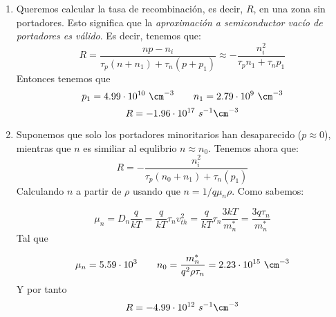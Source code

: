 	\begin{enumerate}[label=\alph*)]
		\item Queremos calcular la tasa de recombinación, es decir, $R$, en una zona sin portadores. Esto significa que la \textit{aproximación a  semiconductor vacío de portadores es válido}. Es decir, tenemos que:
		\begin{equation}
			R = \frac{np-n_i}{\tau_p (n+n_1)+\tau_n (p+p_1)} \approx -\frac{n_i^2}{\tau_p n_1 + \tau_n p_1}
		\end{equation}
		Entonces tenemos que
		\begin{equation}
			p_1 = 4.99\cdot 10^{10} \ \cm^{-3} \qquad n_1= 2.79\cdot 10^{9} \ \cm^{-3}
		\end{equation}
		\begin{equation}
			R = -1.96\cdot 10^{17} \ s^{-1}\cm^{-3}
		\end{equation}
		\item Suponemos que solo los portadores minoritarios han desaparecido ($p\approx 0$), mientras que $n$ es similiar al equlibrio $n\approx n_0$. Tenemos ahora que:
		\begin{equation}
			R = - \frac{n_i^2}{\tau_p(n_0+n_1)+\tau_n(p_1)}
		\end{equation}
		Calculando $n$ a partir de $\rho$ usando que $n = 1/q\mu_n\rho$. Como sabemos:

		\begin{equation}
			\mu_n = D_n  \frac{q}{kT} = \frac{q}{kT}  \tau_n {v_{th}^2} =  \frac{q}{kT}  \tau_n \frac{3kT}{m_n^*} = \frac{3q\tau_n}{ m_n^*}
		\end{equation}
		Tal que

		\begin{equation}
			\mu_n=5.59 \cdot 10^3 \qquad n_0 = \frac{m_n^*}{q^2\rho \tau_n} = 2.23 \cdot 10^{15} \ \cm^{-3}
		\end{equation}
		Y por tanto
		\begin{equation}
			R = -4.99 \cdot 10^{12} \ s^{-1}\cm^{-3}
		\end{equation}
	\end{enumerate}	

